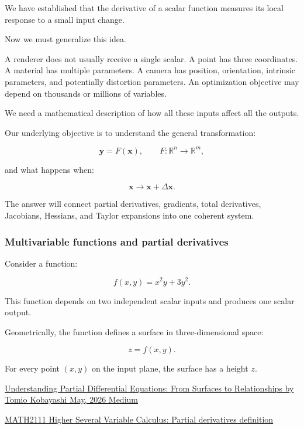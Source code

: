We have established that the derivative of a scalar function measures its local response to a small input change.

Now we must generalize this idea.

A renderer does not usually receive a single scalar. A point has three coordinates. A material has multiple parameters. A camera has position, orientation, intrinsic parameters, and potentially distortion parameters. An optimization objective may depend on thousands or millions of variables.

We need a mathematical description of how all these inputs affect all the outputs.

Our underlying objective is to understand the general transformation:

\[
\mathbf y=F(\mathbf x), \qquad F:\mathbb R^n\rightarrow\mathbb R^m,
\]

and what happens when:

\[
\mathbf x\longrightarrow\mathbf x+\Delta\mathbf x.
\]

The answer will connect partial derivatives, gradients, total derivatives, Jacobians, Hessians, and Taylor expansions into one coherent system.

\subsubsection{Multivariable functions and partial derivatives}\label{02-foundations-ii-ch021-multivariable-functions-and-partial-derivatives}

Consider a function:

\[
f(x,y)=x^2y+3y^2.
\]

This function depends on two independent scalar inputs and produces one scalar output.

Geometrically, the function defines a surface in three-dimensional space:

\[
z=f(x,y).
\]

For every point \((x,y)\) on the input plane, the surface has a height \(z\).

\href{https://images.openai.com/static-rsc-4/GEWWaskcvDs-k2bsfVrRmlEzSQf7QE6m-7riYWFEmjdlQQz374f8l37I0H_qhF8skoNnV5akPnFXPgxsB0R5XVBdkVoZ4mggd_v0u-1BSl56lHDmRf8nQjxd5CDCdry1u_oubL3XSLuw5LwhNU2Y7wf0_B7wqYeZegMjquLa938?purpose=inline}{Understanding Partial Differential Equations: From Surfaces to Relationships \textbar{} by Tomio Kobayashi \textbar{} May, 2026 \textbar{} Medium}

\href{https://images.openai.com/static-rsc-4/e1nonwR6E_jbX1gzC3b2FD5d-QIIrLwkQhy-t7IFdjG_hoMsT-A2Sk6F_QM8Jwz3-lgOqkHr03ugrEHklNd7B963N8uKfSViTHdmD7gf3W2lUH6JaOU7qDr2e4h-BapYF6XNLyBGReGHnwMLCB0kubuwT4Ec80aioW9MUPw5IoA?purpose=inline}{MATH2111 Higher Several Variable Calculus: Partial derivatives definition}

